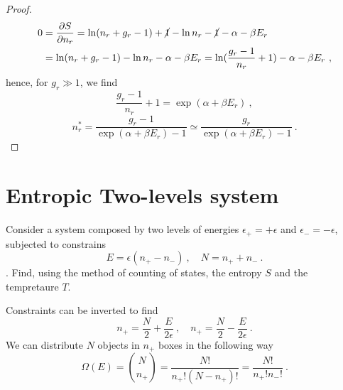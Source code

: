 \begin{proof}
        \begin{equation*}
        \begin{aligned}
            0 & = \frac{\partial S}{\partial n_r} = \ln (n_r + g_r - 1) + \cancel{1} - \ln n_r - \cancel{1} - \alpha - \beta E_r \\ & = \ln (n_r + g_r - 1) - \ln n_r - \alpha - \beta E_r = \ln (\frac{g_r - 1}{n_r} + 1) - \alpha - \beta E_r~ ,
        \end{aligned}
        \end{equation*}
        hence, for $g_r \gg 1$, we find
        \begin{equation*}
            \frac{g_r - 1}{n_r} + 1 = \exp(\alpha + \beta E_r) ~,
        \end{equation*}
        \begin{equation*}
            n_r^* = \frac{g_r - 1}{\exp(\alpha + \beta E_r) - 1} \simeq \frac{g_r}{\exp(\alpha + \beta E_r) - 1} ~.
        \end{equation*}
    \end{proof}

\section{Entropic Two-levels system}

    \begin{exercise}
        Consider a system composed by two levels of energies $\epsilon_+ = + \epsilon$ and $\epsilon_- = - \epsilon$, subjected to constrains
        \begin{equation*}
            E = \epsilon (n_+ - n_-) ~, \quad N = n_+ + n_- ~.
        \end{equation*}. Find, using the method of counting of states, the entropy $S$ and the tempretaure $T$.
    \end{exercise}

    Constraints can be inverted to find
    \begin{equation}
        n_+ = \frac{N}{2} + \frac{E}{2\epsilon} ~, \quad n_+ = \frac{N}{2} - \frac{E}{2\epsilon} ~.
    \end{equation}
    We can distribute $N$ objects in $n_+$ boxes in the following way
    \begin{equation*}
        \Omega(E) = \binom{N}{n_+} = \frac{N!}{n_+! (N - n_+)!}  = \frac{N!}{n_+! n_-!} ~.
    \end{equation*}
    
